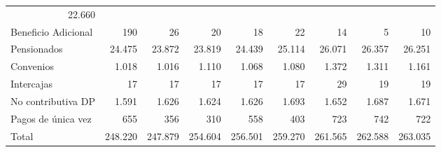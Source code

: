 \begin{tabular}{lllllllll}
  \multicolumn{1}{r}{22.660} \\
\multicolumn{1}{l}{\hspace{1em}Beneficio Adicional} &
  \multicolumn{1}{|r}{190} &
  \multicolumn{1}{r}{26} &
  \multicolumn{1}{r}{20} &
  \multicolumn{1}{r}{18} &
  \multicolumn{1}{r}{22} &
  \multicolumn{1}{r}{14} &
  \multicolumn{1}{r}{5} &
  \multicolumn{1}{r}{10} \\
\multicolumn{1}{l}{\hspace{1em}Pensionados} &
  \multicolumn{1}{|r}{24.475} &
  \multicolumn{1}{r}{23.872} &
  \multicolumn{1}{r}{23.819} &
  \multicolumn{1}{r}{24.439} &
  \multicolumn{1}{r}{25.114} &
  \multicolumn{1}{r}{26.071} &
  \multicolumn{1}{r}{26.357} &
  \multicolumn{1}{r}{26.251} \\
\multicolumn{1}{l}{\hspace{1em}Convenios} &
  \multicolumn{1}{|r}{1.018} &
  \multicolumn{1}{r}{1.016} &
  \multicolumn{1}{r}{1.110} &
  \multicolumn{1}{r}{1.068} &
  \multicolumn{1}{r}{1.080} &
  \multicolumn{1}{r}{1.372} &
  \multicolumn{1}{r}{1.311} &
  \multicolumn{1}{r}{1.161} \\
\multicolumn{1}{l}{\hspace{1em}Intercajas} &
  \multicolumn{1}{|r}{17} &
  \multicolumn{1}{r}{17} &
  \multicolumn{1}{r}{17} &
  \multicolumn{1}{r}{17} &
  \multicolumn{1}{r}{17} &
  \multicolumn{1}{r}{29} &
  \multicolumn{1}{r}{19} &
  \multicolumn{1}{r}{19} \\
\multicolumn{1}{l}{\hspace{1em}No contributiva DP} &
  \multicolumn{1}{|r}{1.591} &
  \multicolumn{1}{r}{1.626} &
  \multicolumn{1}{r}{1.624} &
  \multicolumn{1}{r}{1.626} &
  \multicolumn{1}{r}{1.693} &
  \multicolumn{1}{r}{1.652} &
  \multicolumn{1}{r}{1.687} &
  \multicolumn{1}{r}{1.671} \\
\multicolumn{1}{l}{\hspace{1em}Pagos de única vez} &
  \multicolumn{1}{|r}{655} &
  \multicolumn{1}{r}{356} &
  \multicolumn{1}{r}{310} &
  \multicolumn{1}{r}{558} &
  \multicolumn{1}{r}{403} &
  \multicolumn{1}{r}{723} &
  \multicolumn{1}{r}{742} &
  \multicolumn{1}{r}{722} \\
\multicolumn{1}{l}{\hspace{1em}Total} &
  \multicolumn{1}{|r}{248.220} &
  \multicolumn{1}{r}{247.879} &
  \multicolumn{1}{r}{254.604} &
  \multicolumn{1}{r}{256.501} &
  \multicolumn{1}{r}{259.270} &
  \multicolumn{1}{r}{261.565} &
  \multicolumn{1}{r}{262.588} &
  \multicolumn{1}{r}{263.035} \\
\cline{1-9}
\end{tabular}
